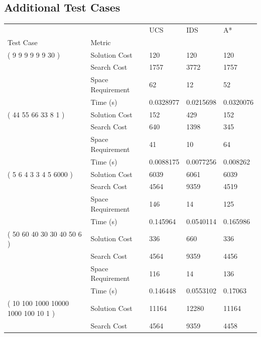 \documentclass[12pt]{diazessay}
\begin{document}
    \subsection{Additional Test Cases}
\hskip-2.8cm
\begin{tabular}{lllll}
\toprule
                        &                            &        UCS &        IDS &         A* \\
Test Case & Metric &            &            &            \\
\midrule
( 9 9 9 9 9 9 30 ) & Solution Cost &        120 &        120 &        120 \\
                        & Search Cost &       1757 &       3772 &       1757 \\
                        & Space Requirement &         62 &         12 &         52 \\
                        & Time (s) &  0.0328977 &  0.0215698 &  0.0320076 \\
( 44 55 66 33 8 1 ) & Solution Cost &        152 &        429 &        152 \\
                        & Search Cost &        640 &       1398 &        345 \\
                        & Space Requirement &         41 &         10 &         64 \\
                        & Time (s) &  0.0088175 &  0.0077256 &   0.008262 \\
( 5 6 4 3 3 4 5 6000 ) & Solution Cost &       6039 &       6061 &       6039 \\
                        & Search Cost &       4564 &       9359 &       4519 \\
                        & Space Requirement &        146 &         14 &        125 \\
                        & Time (s) &   0.145964 &  0.0540114 &   0.165986 \\
( 50 60 40 30 30 40 50 6 ) & Solution Cost &        336 &        660 &        336 \\
                        & Search Cost &       4564 &       9359 &       4456 \\
                        & Space Requirement &        116 &         14 &        136 \\
                        & Time (s) &   0.146448 &  0.0553102 &    0.17063 \\
( 10 100 1000 10000 1000 100 10 1 ) & Solution Cost &      11164 &      12280 &      11164 \\
                        & Search Cost &       4564 &       9359 &       4458 \\

\end{tabular}
\end{document}

